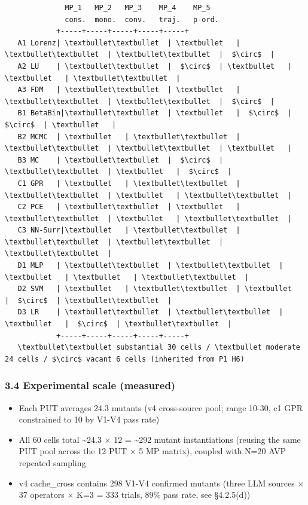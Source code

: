 \documentclass[review,12pt,authoryear]{elsarticle}
\providecommand{\tightlist}{\setlength{\itemsep}{0pt}\setlength{\parskip}{0pt}}
\begin{document}
\begin{verbatim}
              MP_1   MP_2   MP_3    MP_4    MP_5
              cons.  mono.  conv.   traj.   p-ord.
            +-----+-----+-----+-----+-----+
   A1 Lorenz| \textbullet\textbullet  | \textbullet   | \textbullet\textbullet  | \textbullet\textbullet  |  $\circ$  |
   A2 LU    | \textbullet\textbullet  |  $\circ$  | \textbullet   | \textbullet   | \textbullet\textbullet  |
   A3 FDM   | \textbullet\textbullet  | \textbullet   | \textbullet\textbullet  | \textbullet\textbullet  |  $\circ$  |
   B1 BetaBin|\textbullet\textbullet  | \textbullet   |  $\circ$  |  $\circ$  | \textbullet   |
   B2 MCMC  | \textbullet   | \textbullet\textbullet  | \textbullet\textbullet  | \textbullet\textbullet  | \textbullet   |
   B3 MC    | \textbullet\textbullet  |  $\circ$  | \textbullet\textbullet  | \textbullet   |  $\circ$  |
   C1 GPR   | \textbullet   | \textbullet\textbullet  | \textbullet\textbullet  | \textbullet   | \textbullet\textbullet  |
   C2 PCE   | \textbullet\textbullet  | \textbullet   | \textbullet\textbullet  | \textbullet   | \textbullet\textbullet  |
   C3 NN-Surr|\textbullet   | \textbullet\textbullet  | \textbullet\textbullet  | \textbullet\textbullet  | \textbullet\textbullet  |
   D1 MLP   | \textbullet\textbullet  | \textbullet\textbullet  | \textbullet   | \textbullet   | \textbullet\textbullet  |
   D2 SVM   | \textbullet   | \textbullet\textbullet  | \textbullet   |  $\circ$  | \textbullet\textbullet  |
   D3 LR    | \textbullet\textbullet  | \textbullet\textbullet  | \textbullet   |  $\circ$  | \textbullet\textbullet  |
            +-----+-----+-----+-----+-----+
   \textbullet\textbullet substantial 30 cells / \textbullet moderate 24 cells / $\circ$ vacant 6 cells (inherited from P1 H6)
\end{verbatim}

\subsubsection{3.4 Experimental scale
(measured)}\label{experimental-scale-measured}

\begin{itemize}
\tightlist
\item
  Each PUT averages 24.3 mutants (v4 cross-source pool; range 10-30, c1
  GPR constrained to 10 by V1-V4 pass rate)
\item
  All 60 cells total \textasciitilde24.3 $\times$ 12 = \textasciitilde292
  mutant instantiations (reusing the same PUT pool across the 12 PUT $\times$ 5
  MP matrix), coupled with N=20 AVP repeated sampling
\item
  v4 cache\_cross contains 298 V1-V4 confirmed mutants (three LLM
  sources $\times$ 37 operators $\times$ K=3 = 333 trials, 89\% pass rate, see
  §4.2.5(d))
\end{itemize}
\end{document}
